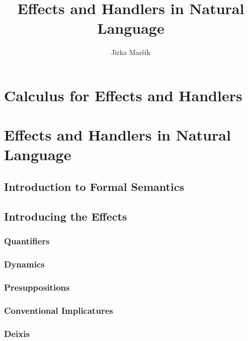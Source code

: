 \documentclass{report}
\title{Effects and Handlers in Natural Language}
\author{Jirka Maršík}
\begin{document}
\maketitle

\tableofcontents



\part{Calculus for Effects and Handlers}









\part{Effects and Handlers in Natural Language}

\chapter{Introduction to Formal Semantics}
\label{chap:intro-fs}

\chapter{Introducing the Effects}
\section{Quantifiers}

\section{Dynamics}
\section{Presuppositions}
\section{Conventional Implicatures}
\section{Deixis}







\end{document}
